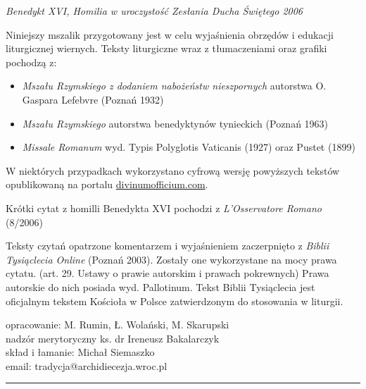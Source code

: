 \documentclass[10pt,a5paper]{book}
\begin{document}
\bigskip

\hfill \textit{Benedykt XVI, Homilia  w uroczystość Zesłania Ducha Świętego 2006}

\vspace*{\fill}

\hrulefill

{\footnotesize Niniejszy mszalik przygotowany jest w celu wyjaśnienia obrzędów i
	edukacji liturgicznej wiernych. Teksty liturgiczne wraz z tłumaczeniami oraz
	grafiki pochodzą z:

	\begin{itemize}[leftmargin=*]
		\item \textit{Mszału Rzymskiego z dodaniem nabożeństw nieszpornych}
		      autorstwa O. Gaspara Lefebvre (Poznań 1932)
		\item \textit{Mszału Rzymskiego} autorstwa benedyktynów tynieckich
		      (Poznań 1963)
		\item \textit{Missale Romanum} wyd. Typis Polyglotis Vaticanis (1927)
		      oraz Pustet (1899)
	\end{itemize}

	W niektórych przypadkach wykorzystano cyfrową wersję powyższych tekstów
	opublikowaną na portalu \url{divinumofficium.com}.

	\medskip

	Krótki cytat z homilli Benedykta XVI pochodzi z \textit{L'Osservatore
		Romano} (8/2006)

	\medskip

	Teksty czytań opatrzone komentarzem i wyjaśnieniem zaczerpnięto z
	\textit{Biblii Tysiąclecia Online} (Poznań 2003). Zostały one wykorzystane
	na mocy prawa cytatu. (art. 29. Ustawy o prawie autorskim i prawach
	pokrewnych) Prawa autorskie do nich posiada wyd. Pallotinum. Tekst Biblii
	Tysiąclecia jest oficjalnym tekstem Kościoła w Polsce zatwierdzonym do
	stosowania w liturgii.

	\bigskip

	opracowanie: M. Rumin, Ł. Wolański, M. Skarupski\\
	nadzór merytoryczny ks. dr Ireneusz Bakalarczyk\\
	skład i łamanie: Michał Siemaszko\\

	email: tradycja@archidiecezja.wroc.pl
}
\hrule

\newpage

\end{document}
